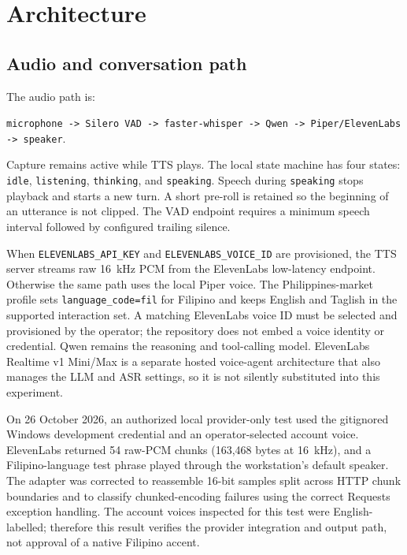 \documentclass[sigconf,nonacm]{acmart}
\begin{document}
\section{Architecture}

\subsection{Audio and conversation path}

The audio path is:
\begin{center}
\texttt{microphone -> Silero VAD -> faster-whisper -> Qwen -> Piper/ElevenLabs -> speaker}.
\end{center}
Capture remains active while TTS plays. The local state machine has four states:
\texttt{idle}, \texttt{listening}, \texttt{thinking}, and \texttt{speaking}.
Speech during \texttt{speaking} stops playback and starts a new turn. A short
pre-roll is retained so the beginning of an utterance is not clipped. The VAD
endpoint requires a minimum speech interval followed by configured trailing
silence.

When \texttt{ELEVENLABS\_API\_KEY} and \texttt{ELEVENLABS\_VOICE\_ID} are
provisioned, the TTS server streams raw 16~kHz PCM from the ElevenLabs
low-latency endpoint. Otherwise the same path uses the local Piper voice.
The Philippines-market profile sets \texttt{language\_code=fil} for Filipino
and keeps English and Taglish in the supported interaction set. A matching
ElevenLabs voice ID must be selected and provisioned by the operator; the
repository does not embed a voice identity or credential.
Qwen remains the reasoning and tool-calling model. ElevenLabs Realtime v1
Mini/Max is a separate hosted voice-agent architecture that also manages the
LLM and ASR settings, so it is not silently substituted into this experiment.

On 26 October 2026, an authorized local provider-only test used the
gitignored Windows development credential and an operator-selected account
voice. ElevenLabs returned 54 raw-PCM chunks (163,468 bytes at 16~kHz), and a
Filipino-language test phrase played through the workstation's default
speaker. The adapter was corrected to reassemble 16-bit samples split across
HTTP chunk boundaries and to classify chunked-encoding failures using the
correct Requests exception handling. The account voices inspected
for this test were English-labelled; therefore this result verifies the
provider integration and output path, not approval of a native Filipino
accent.
\end{document}
